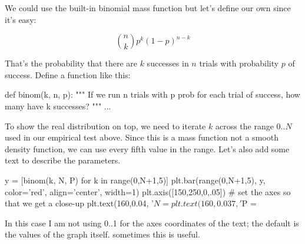 \begin{fullwidth}

\step We could use the built-in binomial mass function but let's define our own since it's easy:

\[\tag{Binomial mass function}
\binom{n}{k} p^k (1-p)^{n-k}
\]

\noindent That's the probability that there are $k$ successes in $n$ trials with probability $p$ of success. Define a function like this:

\begin{pyverbatim}
def binom(k, n, p):
    """
    If we run n trials with p prob for each trial of success,
    how many have k successes?
    """
    ...
\end{pyverbatim}

\step To show the real distribution on top, we need to iterate $k$ across the range $0..N$ used in our empirical test above.  Since this is a mass function not a smooth density function, we can use every fifth value in the range. Let's also add some text to describe the parameters.

\begin{pyverbatim}
y = [binom(k, N, P) for k in range(0,N+1,5)]
plt.bar(range(0,N+1,5), y, color='red', align='center', width=1)
plt.axis([150,250,0,.05]) # set the axes so that we get a close-up
plt.text(160,0.04, '$N = %
plt.text(160,0.037, '$P = %
\end{pyverbatim}

In this case I am not using 0..1 for the axes coordinates of the text; the default is the values of the graph itself. sometimes this is useful.


\end{fullwidth}
